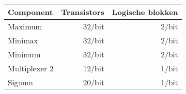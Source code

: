 \begin{tabular}{l|rr}
Component&Transistors&Logische blokken\\\hline
Maximum&32/bit&2/bit\\
Minimax&32/bit&2/bit\\
Minimum&32/bit&2/bit\\
Multiplexer 2&12/bit&1/bit\\
Signum&20/bit&1/bit
\end{tabular}